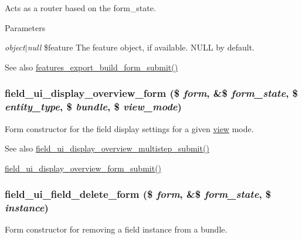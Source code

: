 Acts as a router based on the form\_\-state.


\begin{DoxyParams}{Parameters}
\item[{\em object$|$null}]\$feature The feature object, if available. NULL by default.\end{DoxyParams}
\begin{DoxySeeAlso}{See also}
\hyperlink{features_8admin_8inc_afb232d8f40ae6b186567c6091ef0550e}{features\_\-export\_\-build\_\-form\_\-submit()} 
\end{DoxySeeAlso}
\hypertarget{group__forms_gad03c0a01179bc9ebb22b5c35784e1abf}{
\subsubsection[{field\_\-ui\_\-display\_\-overview\_\-form}]{\setlength{\rightskip}{0pt plus 5cm}field\_\-ui\_\-display\_\-overview\_\-form (\$ {\em form}, \/  \&\$ {\em form\_\-state}, \/  \$ {\em entity\_\-type}, \/  \$ {\em bundle}, \/  \$ {\em view\_\-mode})}}
\label{group__forms_gad03c0a01179bc9ebb22b5c35784e1abf}
Form constructor for the field display settings for a given \hyperlink{classview}{view} mode.

\begin{DoxySeeAlso}{See also}
\hyperlink{field__ui_8admin_8inc_a5003d474d7984c50c9a16b33c5c4c403}{field\_\-ui\_\-display\_\-overview\_\-multistep\_\-submit()} 

\hyperlink{field__ui_8admin_8inc_a06179df88eafaa552c7eeb5fdd144ccf}{field\_\-ui\_\-display\_\-overview\_\-form\_\-submit()} 
\end{DoxySeeAlso}
\hypertarget{group__forms_gaaf4ce327f76bcd961e5de338558e704e}{
\subsubsection[{field\_\-ui\_\-field\_\-delete\_\-form}]{\setlength{\rightskip}{0pt plus 5cm}field\_\-ui\_\-field\_\-delete\_\-form (\$ {\em form}, \/  \&\$ {\em form\_\-state}, \/  \$ {\em instance})}}
\label{group__forms_gaaf4ce327f76bcd961e5de338558e704e}
Form constructor for removing a field instance from a bundle.

